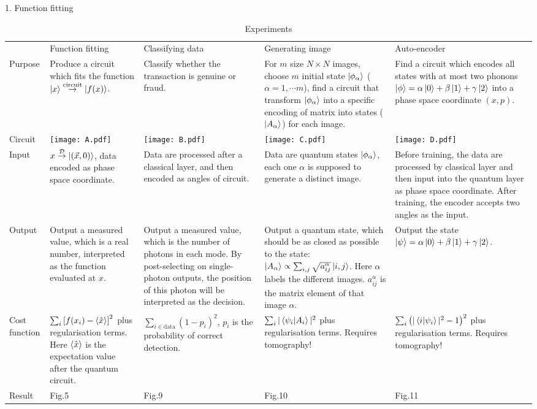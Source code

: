 \documentclass{article}
\begin{document}
1. Function fitting
\begin{table}[H]
  \centering
  \caption{Experiments}
  \label{tab:label}
  \extrarowsep=3mm
  \begin{tabu}{X[0.5]|X|X|X|X}
    & Function fitting & Classifying data & Generating image & Auto-encoder 
    \\
    Purpose &
    Produce a circuit which fits the function
    $\ket{x} \overset{\text{circuit}}{\to} \ket{f(x)}$.&
    Classify whether the transaction is genuine or fraud. &
    For $m$ size $N\times N$ images, choose $m$ initial state $\ket{\phi_\alpha}$
    ($\alpha = 1,\cdots m$), find a circuit that transform $\ket{\phi_\alpha}$
    into a specific encoding of matrix into states ($\ket{A_\alpha}$) for each
    image. &
    Find a circuit which encodes all states with at most two phonons
    $\ket{\phi}=\alpha\ket{0} + \beta\ket{1} +\gamma\ket{2}$ into a phase space
    coordinate $(x,p)$.
    \\
    Circuit &
    \texttt{[image: A.pdf]} &
    \texttt{[image: B.pdf]} &
    \texttt{[image: C.pdf]} &
    \texttt{[image: D.pdf]} 
    \\
    Input &
    $x \overset{\mathcal{D}}{\to} \ket{(\vec{x},0)}$, data encoded as
    phase space coordinate.&
    Data are processed after a classical layer, and then encoded as angles of circuit.&
    Data are quantum states $\ket{\phi_\alpha}$, each one $\alpha$ is supposed
    to generate a distinct image.&
    Before training, the data are processed by classical layer and then input
    into the quantum layer as phase space coordinate. After training, the encoder accepts two angles as
    the input.
    \\
    Output &
    Output a measured value, which is a real number, interpreted as the function evaluated at $x$. &
    Output a measured value, which is the number of photons in each mode. By
    post-selecting on single-photon outputs, the position of this photon will be
    interpreted as the decision.&
    Output a quantum state, which should be as closed as possible to the state:
    $\ket{A_\alpha} \propto \sum_{i,j} \sqrt{a_{ij}^\alpha} \ket{i,j} $. Here
    $\alpha$ labels the different images. $a_{ij}^\alpha$ is the matrix element of
    that image $\alpha$.&
    Output the state $\ket{\psi} = \alpha\ket{0} + \beta\ket{1} +
    \gamma\ket{2}$.
    \\
    Cost function &
    $\sum_i \left[f(x_i) - \braket{\hat{x}} \right]^2$ plus
    regularisation terms. Here $\braket{\hat{x}}$ is the expectation value after
    the quantum circuit.&
    $\sum_{i\in \text{data}} (1-p_i)^2$, $p_i$ is the probability of correct
    detection.&
    $\sum_i |\braket{\psi_i | A_i}|^2$ plus regularisation terms. Requires 
    tomography! &
    $\sum_i \left(|\braket{ i| \psi_i }|^2 -1\right)^2$ plus regularisation terms.
    Requires tomography!
    \\
    Result &
    Fig.5 & Fig.9 & Fig.10 & Fig.11 
  \end{tabu}
\end{table}
\end{document}
